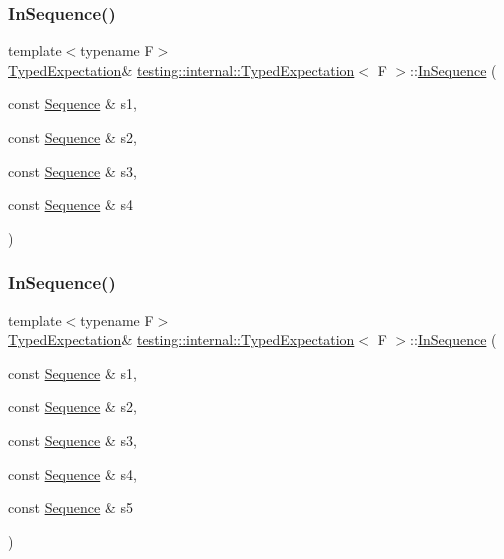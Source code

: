 \subsubsection{\texorpdfstring{In\+Sequence()}{InSequence()}\hspace{0.1cm}{\footnotesize\ttfamily [4/5]}}
{\footnotesize\ttfamily template$<$typename F$>$ \\
\hyperlink{classtesting_1_1internal_1_1_typed_expectation}{Typed\+Expectation}\& \hyperlink{classtesting_1_1internal_1_1_typed_expectation}{testing\+::internal\+::\+Typed\+Expectation}$<$ F $>$\+::\hyperlink{classtesting_1_1_in_sequence}{In\+Sequence} (\begin{DoxyParamCaption}\item[{const \hyperlink{classtesting_1_1_sequence}{Sequence} \&}]{s1,  }\item[{const \hyperlink{classtesting_1_1_sequence}{Sequence} \&}]{s2,  }\item[{const \hyperlink{classtesting_1_1_sequence}{Sequence} \&}]{s3,  }\item[{const \hyperlink{classtesting_1_1_sequence}{Sequence} \&}]{s4 }\end{DoxyParamCaption})\hspace{0.3cm}{\ttfamily [inline]}}

\mbox{\label{classtesting_1_1internal_1_1_typed_expectation_ad8775f8ba9965d1836f6e4c09baf1c3e}} 
\subsubsection{\texorpdfstring{In\+Sequence()}{InSequence()}\hspace{0.1cm}{\footnotesize\ttfamily [5/5]}}
{\footnotesize\ttfamily template$<$typename F$>$ \\
\hyperlink{classtesting_1_1internal_1_1_typed_expectation}{Typed\+Expectation}\& \hyperlink{classtesting_1_1internal_1_1_typed_expectation}{testing\+::internal\+::\+Typed\+Expectation}$<$ F $>$\+::\hyperlink{classtesting_1_1_in_sequence}{In\+Sequence} (\begin{DoxyParamCaption}\item[{const \hyperlink{classtesting_1_1_sequence}{Sequence} \&}]{s1,  }\item[{const \hyperlink{classtesting_1_1_sequence}{Sequence} \&}]{s2,  }\item[{const \hyperlink{classtesting_1_1_sequence}{Sequence} \&}]{s3,  }\item[{const \hyperlink{classtesting_1_1_sequence}{Sequence} \&}]{s4,  }\item[{const \hyperlink{classtesting_1_1_sequence}{Sequence} \&}]{s5 }\end{DoxyParamCaption})\hspace{0.3cm}{\ttfamily [inline]}}


